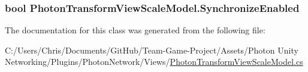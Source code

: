 \subsubsection[{\texorpdfstring{Synchronize\+Enabled}{SynchronizeEnabled}}]{\setlength{\rightskip}{0pt plus 5cm}bool Photon\+Transform\+View\+Scale\+Model.\+Synchronize\+Enabled}\hypertarget{class_photon_transform_view_scale_model_a22b3360da0a4aa09e0086af1ae091da2}{}\label{class_photon_transform_view_scale_model_a22b3360da0a4aa09e0086af1ae091da2}


The documentation for this class was generated from the following file\+:\begin{DoxyCompactItemize}
\item 
C\+:/\+Users/\+Chris/\+Documents/\+Git\+Hub/\+Team-\/\+Game-\/\+Project/\+Assets/\+Photon Unity Networking/\+Plugins/\+Photon\+Network/\+Views/\hyperlink{_photon_transform_view_scale_model_8cs}{Photon\+Transform\+View\+Scale\+Model.\+cs}\end{DoxyCompactItemize}
